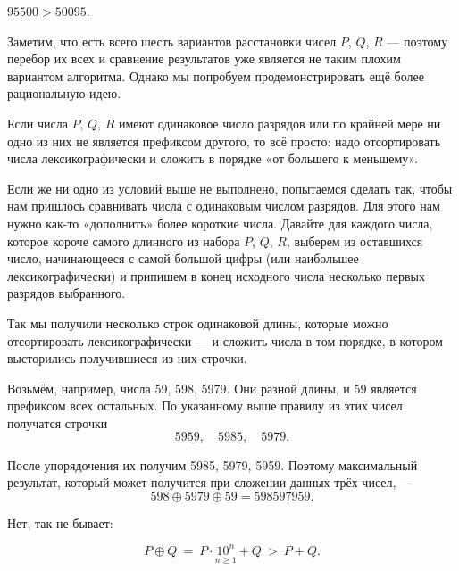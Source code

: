 \begin{itemize}
\itA $95500 > 50095$.

\itB Заметим, что есть всего шесть вариантов расстановки чисел $P$, $Q$, $R$ — поэтому перебор их всех и сравнение результатов уже является не таким плохим вариантом алгоритма. Однако мы попробуем продемонстрировать ещё более рациональную идею.

Если числа $P$, $Q$, $R$ имеют одинаковое число разрядов или по крайней мере ни одно из них не является префиксом другого, то всё просто: надо отсортировать числа лексикографически и сложить в порядке «от большего к меньшему».

Если же ни одно из условий выше не выполнено, попытаемся сделать так, чтобы нам пришлось сравнивать числа с одинаковым числом разрядов. Для этого нам нужно как-то «дополнить» более короткие числа. Давайте для каждого числа, которое короче самого длинного из набора $P$, $Q$, $R$, выберем из оставшихся число, начинающееся с самой большой цифры (или наибольшее лексикографически) и припишем в конец исходного числа несколько первых разрядов выбранного.

Так мы получили несколько строк одинаковой длины, которые можно отсортировать лексикографически — и сложить числа в том порядке, в котором высторились получившиеся из них строчки.

Возьмём, например, числа 59, 598, 5979. Они разной длины, и 59 является префиксом всех остальных. По указанному выше правилу из этих чисел получатся строчки
	$$59\underline{59},\quad 598\underline{5},\quad 5979.$$

После упорядочения их получим 5985, 5979, 5959. Поэтому максимальный результат, который может получится при сложении данных трёх чисел, —
	$$598 \oplus 5979 \oplus 59 = 598597959.$$

\itC Нет, так не бывает:

$$P \oplus Q\ =\ P \cdot \underset{n\geq1}{10^n} + Q\ >\ P+Q.$$
\end{itemize}
